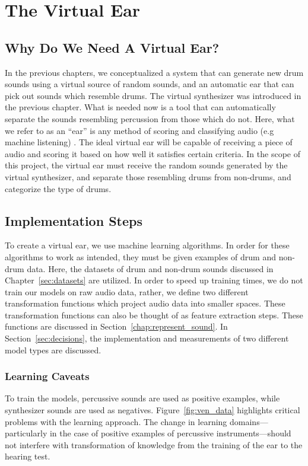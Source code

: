 \documentclass[\main/thesis.tex]{subfiles}
\begin{document}
\chapter{The Virtual Ear}
\section{Why Do We Need A Virtual Ear?}
\label{sec:ear}
In the previous chapters, we conceptualized a system that can generate new drum sounds using a virtual source of random sounds, and an automatic ear that can pick out sounds which resemble drums. The virtual synthesizer was introduced in the previous chapter. What is needed now is a tool that can automatically separate the sounds resembling percussion from those which do not. Here, what we refer to as an \enquote{ear} is any method of scoring and classifying audio (e.g machine listening) \cite{malkin2006machine,rowe1992interactive}. The ideal virtual ear will be capable of receiving a piece of audio and scoring it based on how well it satisfies certain criteria. In the scope of this project, the virtual ear must receive the random sounds generated by the virtual synthesizer, and separate those resembling drums from non-drums, and categorize the type of drums. 
 
\section{Implementation Steps}
To create a virtual ear, we use machine learning algorithms. In order for these algorithms to work as intended, they must be given examples of drum and non-drum data. Here, the datasets of drum and non-drum sounds discussed in Chapter~\ref{sec:datasets} are utilized. In order to speed up training times, we do not train our models on raw audio data, rather, we define two different transformation functions which project audio data into smaller spaces. These transformation functions can also be thought of as feature extraction steps. These functions are discussed in Section~\ref{chap:represent_sound}. In Section~\ref{sec:decisions}, the implementation and measurements of two different model types are discussed.

\subsection{Learning Caveats}
To train the models, percussive sounds are used as positive examples, while synthesizer sounds are used as negatives. Figure~\ref{fig:ven_data} highlights critical problems with the learning approach. The change in learning domains---particularly in the case of positive examples of percussive instruments---should not interfere with transformation of knowledge from the training of the ear to the hearing test. 
\end{document}
